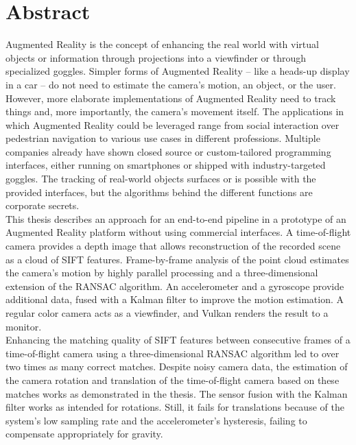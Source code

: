 
\chapter*{Abstract}
\label{sec:Abstract}
Augmented Reality is the concept of enhancing the real world with virtual objects or information through projections into a viewfinder or through specialized goggles. Simpler forms of Augmented Reality – like a heads-up display in a car – do not need to estimate the camera's motion, an object, or the user.  However, more elaborate implementations of Augmented Reality need to track things and, more importantly, the camera's movement itself. The applications in which Augmented Reality could be leveraged range from social interaction over pedestrian navigation to various use cases in different professions. Multiple companies already have shown closed source or custom-tailored programming interfaces, either running on smartphones or shipped with industry-targeted goggles. The tracking of real-world objects surfaces or is possible with the provided interfaces, but the algorithms behind the different functions are corporate secrets.\\ 
This thesis describes an approach for an end-to-end pipeline in a prototype of an Augmented Reality platform without using commercial interfaces. A time-of-flight camera provides a depth image that allows reconstruction of the recorded scene as a cloud of SIFT features. Frame-by-frame analysis of the point cloud estimates the camera's motion by highly parallel processing and a three-dimensional extension of the RANSAC algorithm. An accelerometer and a gyroscope provide additional data, fused with a Kalman filter to improve the motion estimation. A regular color camera acts as a viewfinder, and Vulkan renders the result to a monitor.\\
Enhancing the matching quality of SIFT features between consecutive frames of a time-of-flight camera using a three-dimensional RANSAC algorithm led to over two times as many correct matches. Despite noisy camera data, the estimation of the camera rotation and translation of the time-of-flight camera based on these matches works as demonstrated in the thesis. The sensor fusion with the Kalman filter works as intended for rotations. Still, it fails for translations because of the system's low sampling rate and the accelerometer's hysteresis, failing to compensate appropriately for gravity.


